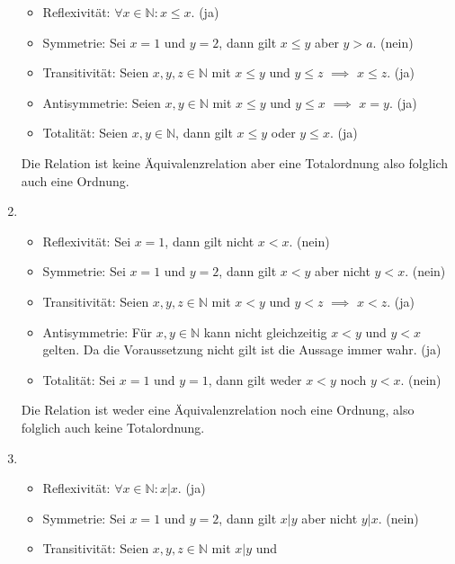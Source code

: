 \documentclass[german,12pt]{homework}
\newcommand{\NN}{\mathbb{N}}
\begin{document}
\begin{enumerate}
\begin{itemize}
            \item Reflexivität: \({\forall}x \in \NN: x \le x\). (ja)
            \item Symmetrie: Sei \(x = 1\) und \(y = 2\), dann gilt \(x \le y\)
            aber \(y > a\). (nein)
            \item Transitivität: Seien \(x, y, z \in \NN\) mit \(x \le y\) und
            \(y \le z\) \(\implies\) \(x \le z\). (ja)
            \item Antisymmetrie: Seien \(x, y \in \NN\) mit \(x \le y\) und \(y
            \le x\) \(\implies\) \(x = y\). (ja)
            \item Totalität: Seien \(x, y \in \NN\), dann gilt \(x \le y\) oder
            \(y \le x\). (ja)
    	\end{itemize}
    	Die Relation ist keine Äquivalenzrelation aber eine Totalordnung also
        folglich auch eine Ordnung.
        \item\ \\
        \begin{itemize}
            \item Reflexivität: Sei \(x = 1\), dann gilt nicht \(x < x\). (nein)
            \item Symmetrie: Sei \(x = 1\) und \(y = 2\), dann gilt \(x < y\)
            aber nicht \(y < x\). (nein)
            \item Transitivität: Seien \(x, y, z \in \NN\) mit \(x < y\) und
            \(y < z\) \(\implies\) \(x < z\). (ja)
            \item Antisymmetrie: Für \(x, y \in \NN\) kann nicht gleichzeitig
            \(x < y\) und \(y < x\) gelten. Da die Voraussetzung nicht gilt ist
            die Aussage immer wahr. (ja)
            \item Totalität: Sei \(x = 1\) und \(y = 1\), dann gilt weder \(x <
            y\) noch \(y < x\). (nein)
    	\end{itemize}
    	Die Relation ist weder eine Äquivalenzrelation noch eine Ordnung, also
        folglich auch keine Totalordnung.
        \item\ \\
        \begin{itemize}
            \item Reflexivität: \({\forall}x \in \NN: x | x\). (ja)
            \item Symmetrie: Sei \(x = 1\) und \(y = 2\), dann gilt \(x | y\)
            aber nicht \(y | x\). (nein)
            \item Transitivität: Seien \(x, y, z \in \NN\) mit \(x | y\) und

\end{itemize}
\end{enumerate}
\end{document}
